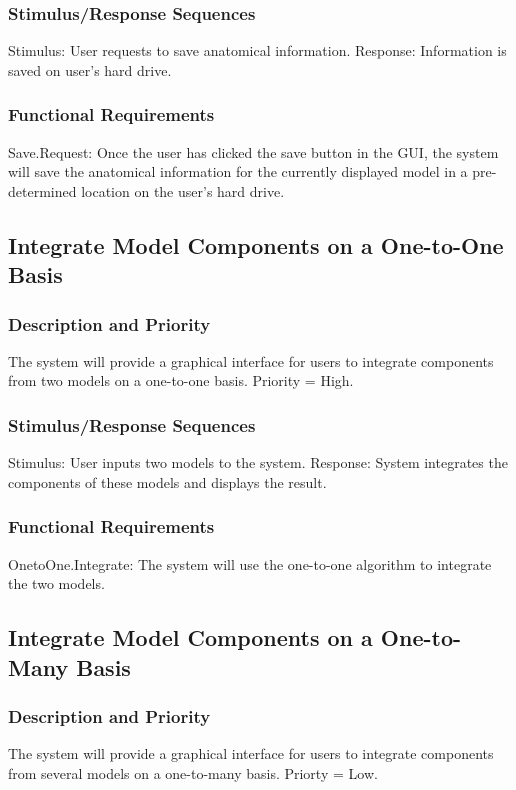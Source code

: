 \documentclass{article}
\begin{document}
\subsubsection{Stimulus/Response Sequences}

Stimulus: User requests to save anatomical information.
Response: Information is saved on user's hard drive.

\subsubsection{Functional Requirements}
Save.Request: Once the user has clicked the save button in the GUI, the system will save the anatomical information for the currently displayed model in a pre-determined location on the user's hard drive.


\subsection{Integrate Model Components on a One-to-One Basis}

\subsubsection{Description and Priority}
The system will provide a graphical interface for users to integrate components from two models on a one-to-one basis.  Priority = High.

\subsubsection{Stimulus/Response Sequences}
Stimulus: User inputs two models to the system.
Response: System integrates the components of these models and displays the result.

\subsubsection{Functional Requirements}
OnetoOne.Integrate: The system will use the one-to-one algorithm to integrate the two models.

\subsection{Integrate Model Components on a One-to-Many Basis}
\subsubsection{Description and Priority}
The system will provide a graphical interface for users to integrate components from several models on a one-to-many basis.  Priorty = Low.
\end{document}
